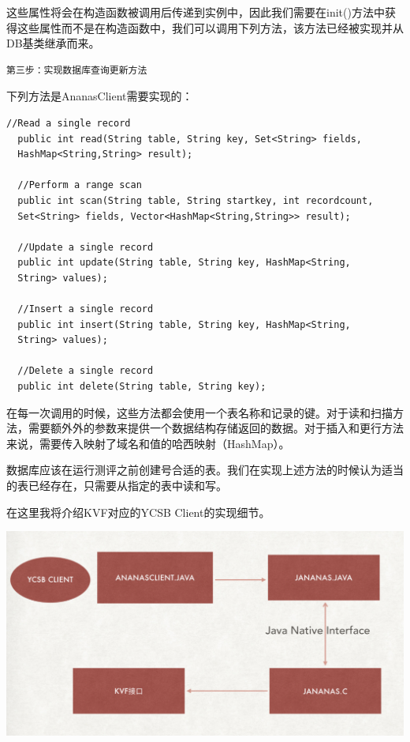 		这些属性将会在构造函数被调用后传递到实例中，因此我们需要在init()方法中获得这些属性而不是在构造函数中，我们可以调用下列方法，该方法已经被实现并从DB基类继承而来。


		\begin{Verbatim}[frame = none]
    第三步：实现数据库查询更新方法
		\end{Verbatim}

		下列方法是AnanasClient需要实现的：

		\begin{Verbatim}[frame = single]
  //Read a single record
  public int read(String table, String key, Set<String> fields, 
  HashMap<String,String> result);

  //Perform a range scan
  public int scan(String table, String startkey, int recordcount, 
  Set<String> fields, Vector<HashMap<String,String>> result);
	
  //Update a single record
  public int update(String table, String key, HashMap<String,
  String> values);

  //Insert a single record
  public int insert(String table, String key, HashMap<String,
  String> values);

  //Delete a single record
  public int delete(String table, String key);

		\end{Verbatim}
		在每一次调用的时候，这些方法都会使用一个表名称和记录的键。对于读和扫描方法，需要额外外的参数来提供一个数据结构存储返回的数据。对于插入和更行方法来说，需要传入映射了域名和值的哈西映射（HashMap）。

		数据库应该在运行测评之前创建号合适的表。我们在实现上述方法的时候认为适当的表已经存在，只需要从指定的表中读和写。

		在这里我将介绍KVF对应的YCSB Client的实现细节。
\begin{center}
	\includegraphics[width=13.9cm]{img/figure11.pdf}
\end{center}
		
